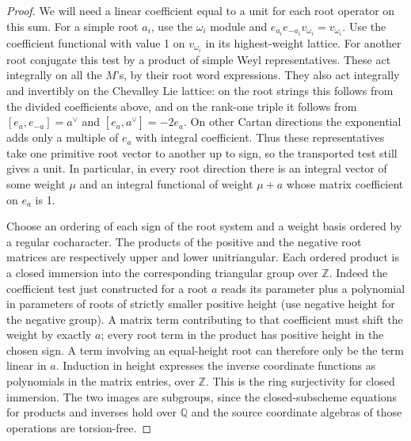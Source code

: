 \documentclass[11pt,a4paper,openany,oneside]{book}
\theoremstyle{resultstyle}
\theoremstyle{definition}
\numberwithin{equation}{chapter}
\newcommand{\ZZ}{\mathbb{Z}}
\newcommand{\QQ}{\mathbb{Q}}
\begin{document}
\begin{proof}
We will need a linear coefficient equal to a unit
for each root operator on this sum. For a simple
root \(a_i\), use the \(\omega_i\) module and
\(e_{a_i} e_{-a_i} v_{\omega_i}=v_{\omega_i}\).
Use the coefficient functional with value 1
on \(v_{\omega_i}\) in its highest-weight
lattice. For another root conjugate this test
by a product of simple Weyl representatives.
These act integrally on all the \(M\)'s, by
their root word expressions. They also act
integrally and invertibly on the Chevalley
Lie lattice: on the root strings this follows
from the divided coefficients above, and on
the rank-one triple it follows from
\([e_a,e_{-a}]=a^\vee\) and
\([e_a,a^\vee]=-2e_a\). On other Cartan
directions the exponential adds only a
multiple of \(e_a\) with integral coefficient.
Thus these representatives take one primitive
root vector to another up to sign, so the
transported test still gives a unit. In
particular, in every root direction there is
an integral vector of some weight \(\mu\)
and an integral functional of weight
\(\mu+a\) whose matrix coefficient on \(e_a\)
is 1.

Choose an ordering of each sign of the root
system and a weight basis ordered by a regular
cocharacter. The products of the positive and
the negative root matrices are respectively
upper and lower unitriangular. Each ordered
product is a closed immersion into the
corresponding triangular group over \(\ZZ\).
Indeed the coefficient test just constructed
for a root \(a\) reads its parameter plus a
polynomial in parameters of roots of strictly
smaller positive height (use negative height
for the negative group). A matrix term
contributing to that coefficient must shift
the weight by exactly \(a\); every root term
in the product has positive height in the
chosen sign. A term involving an equal-height
root can therefore only be the term linear
in \(a\). Induction in height expresses the
inverse coordinate functions as polynomials
in the matrix entries, over \(\ZZ\). This is
the ring surjectivity for closed immersion.
The two images are subgroups, since the
closed-subscheme equations for products and
inverses hold over \(\QQ\) and the source
coordinate algebras of those operations
are torsion-free.


\end{proof}
\end{document}
